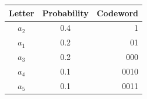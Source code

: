       \begin{table}
        \centering
        \begin{tabular}{ccr}
          \toprule
          Letter & Probability & Codeword \\
          \midrule
          $a_2$ & 0.4 & 1 \\
          $a_1$ & 0.2 & 01 \\
          $a_3$ & 0.2 & 000 \\
          $a_4$ & 0.1 & 0010 \\
          $a_5$ & 0.1 & 0011 \\
          \bottomrule
        \end{tabular}
        \label{tab:huffman2}
      \end{table}






